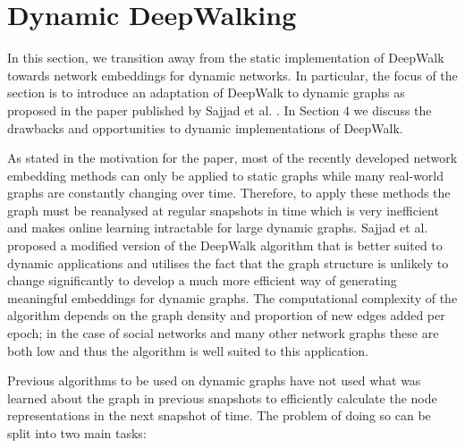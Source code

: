 \documentclass[a4paper]{article}
\begin{document}
\section{Dynamic DeepWalking}
In this section, we transition away from the static implementation of DeepWalk
towards network embeddings for dynamic networks. In particular, the focus of the
section is to introduce an adaptation of DeepWalk to dynamic graphs as
proposed in the paper published by Sajjad et al. \cite{sajjad2019}. In Section 4
we discuss the drawbacks and opportunities to dynamic implementations of DeepWalk.

As stated in the motivation for the paper, most of the recently developed
network embedding methods can only be applied to static graphs while many
real-world graphs are constantly changing over time. Therefore, to apply these
methods the graph must be reanalysed at regular snapshots in time which is very inefficient and makes
online learning intractable for large dynamic graphs. Sajjad et al. proposed a modified version of the DeepWalk
algorithm that is better suited to dynamic applications and utilises the fact that the
graph structure is unlikely to change significantly to develop a much more
efficient way of generating meaningful embeddings for dynamic graphs.
The computational complexity of the algorithm depends on the graph density and
proportion of new edges added per epoch; in the case of social networks and many other network graphs these
are both low and thus the algorithm is well suited to this application.

Previous algorithms to be used on dynamic graphs have not used what
was learned about the graph in previous snapshots to efficiently calculate the
node representations in the next snapshot of time. The problem of doing so can
be split into two main tasks:
\end{document}
